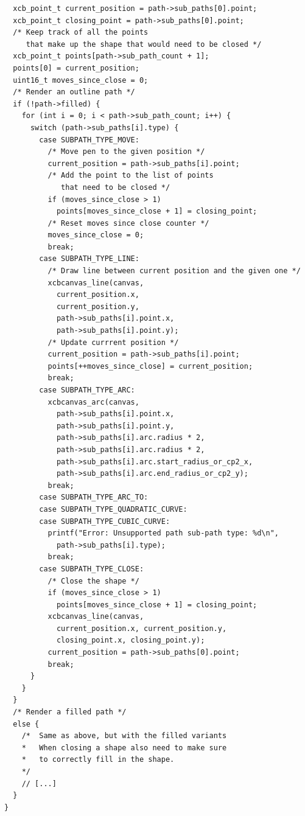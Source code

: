 \begin{verbatim}
  xcb_point_t current_position = path->sub_paths[0].point;
  xcb_point_t closing_point = path->sub_paths[0].point;
  /* Keep track of all the points
     that make up the shape that would need to be closed */
  xcb_point_t points[path->sub_path_count + 1];
  points[0] = current_position;
  uint16_t moves_since_close = 0;
  /* Render an outline path */
  if (!path->filled) {
    for (int i = 0; i < path->sub_path_count; i++) {
      switch (path->sub_paths[i].type) {
        case SUBPATH_TYPE_MOVE:
          /* Move pen to the given position */
          current_position = path->sub_paths[i].point;
          /* Add the point to the list of points
             that need to be closed */
          if (moves_since_close > 1)
            points[moves_since_close + 1] = closing_point;
          /* Reset moves since close counter */
          moves_since_close = 0;
          break;
        case SUBPATH_TYPE_LINE:
          /* Draw line between current position and the given one */
          xcbcanvas_line(canvas,
            current_position.x,
            current_position.y,
            path->sub_paths[i].point.x,
            path->sub_paths[i].point.y);
          /* Update currrent position */
          current_position = path->sub_paths[i].point;
          points[++moves_since_close] = current_position;
          break;
        case SUBPATH_TYPE_ARC:
          xcbcanvas_arc(canvas,
            path->sub_paths[i].point.x,
            path->sub_paths[i].point.y,
            path->sub_paths[i].arc.radius * 2,
            path->sub_paths[i].arc.radius * 2,
            path->sub_paths[i].arc.start_radius_or_cp2_x,
            path->sub_paths[i].arc.end_radius_or_cp2_y);
          break;
        case SUBPATH_TYPE_ARC_TO:
        case SUBPATH_TYPE_QUADRATIC_CURVE:
        case SUBPATH_TYPE_CUBIC_CURVE:
          printf("Error: Unsupported path sub-path type: %d\n",
            path->sub_paths[i].type);
          break;
        case SUBPATH_TYPE_CLOSE:
          /* Close the shape */
          if (moves_since_close > 1)
            points[moves_since_close + 1] = closing_point;
          xcbcanvas_line(canvas,
            current_position.x, current_position.y,
            closing_point.x, closing_point.y);
          current_position = path->sub_paths[0].point;
          break;
      }
    }
  }
  /* Render a filled path */
  else {
    /*  Same as above, but with the filled variants
    *   When closing a shape also need to make sure
    *   to correctly fill in the shape.
    */
    // [...]
  }
}
\end{verbatim}

